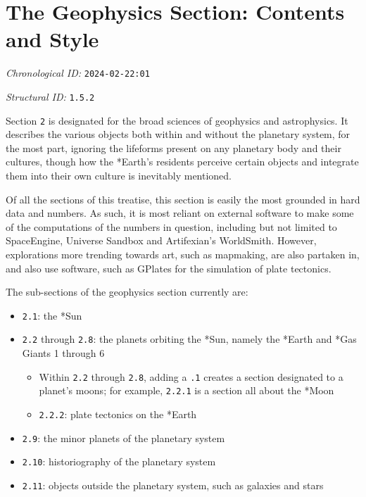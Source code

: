 \section{The Geophysics Section: Contents and Style}
\emph{Chronological ID:} \texttt{2024-02-22:01}

\emph{Structural ID:} \texttt{1.5.2}

Section \texttt{2} is designated for the broad sciences of geophysics and astrophysics. It describes the various objects both within and without the planetary system, for the most part, ignoring the lifeforms present on any planetary body and their cultures, though how the *Earth's residents perceive certain objects and integrate them into their own culture is inevitably mentioned.

Of all the sections of this treatise, this section is easily the most grounded in hard data and numbers. As such, it is most reliant on external software to make some of the computations of the numbers in question, including but not limited to SpaceEngine, Universe Sandbox and Artifexian's WorldSmith. However, explorations more trending towards art, such as mapmaking, are also partaken in, and also use software, such as GPlates for the simulation of plate tectonics.

The sub-sections of the geophysics section currently are:

\begin{itemize}
  \item \texttt{2.1}: the *Sun
  \item \texttt{2.2} through \texttt{2.8}: the planets orbiting the *Sun, namely the *Earth and *Gas Giants 1 through 6
  \begin{itemize}
    \item Within \texttt{2.2} through \texttt{2.8}, adding a \texttt{.1} creates a section designated to a planet's moons; for example, \texttt{2.2.1} is a section all about the *Moon
    \item \texttt{2.2.2}: plate tectonics on the *Earth
  \end{itemize}
  \item \texttt{2.9}: the minor planets of the planetary system
  \item \texttt{2.10}: historiography of the planetary system
  \item \texttt{2.11}: objects outside the planetary system, such as galaxies and stars
\end{itemize}
\newpage
